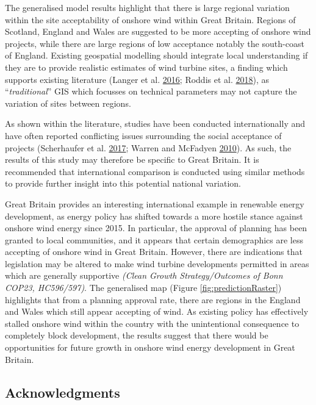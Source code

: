 \documentclass[a4paper,]{article}
\theoremstyle{definition}
\theoremstyle{definition}
\theoremstyle{definition}
\theoremstyle{remark}
\begin{document}
The generalised model results highlight that there is large regional
variation within the site acceptability of onshore wind within Great
Britain. Regions of Scotland, England and Wales are suggested to be more
accepting of onshore wind projects, while there are large regions of low
acceptance notably the south-coast of England. Existing geospatial
modelling should integrate local understanding if they are to provide
realistic estimates of wind turbine sites, a finding which supports
existing literature (Langer et al.
\protect\hyperlink{ref-Langer2016}{2016}; Roddis et al.
\protect\hyperlink{ref-Roddis2018}{2018}), as ``\emph{traditional}'' GIS
which focusses on technical parameters may not capture the variation of
sites between regions.

As shown within the literature, studies have been conducted
internationally and have often reported conflicting issues surrounding
the social acceptance of projects (Scherhaufer et al.
\protect\hyperlink{ref-Scherhaufer2017}{2017}; Warren and McFadyen
\protect\hyperlink{ref-Warren2010}{2010}). As such, the results of this
study may therefore be specific to Great Britain. It is recommended that
international comparison is conducted using similar methods to provide
further insight into this potential national variation.

Great Britain provides an interesting international example in renewable
energy development, as energy policy has shifted towards a more hostile
stance against onshore wind energy since 2015. In particular, the
approval of planning has been granted to local communities, and it
appears that certain demographics are less accepting of onshore wind in
Great Britain. However, there are indications that legislation may be
altered to make wind turbine developments permitted in areas which are
generally supportive \emph{(Clean Growth Strategy/Outcomes of Bonn
COP23, HC596/597)}. The generalised map (Figure
\ref{fig:predictionRaster}) highlights that from a planning approval
rate, there are regions in the England and Wales which still appear
accepting of wind. As existing policy has effectively stalled onshore
wind within the country with the unintentional consequence to completely
block development, the results suggest that there would be opportunities
for future growth in onshore wind energy development in Great Britain.

\hypertarget{acknowledgments}{%
\subsection*{Acknowledgments}\label{acknowledgments}}
\end{document}

